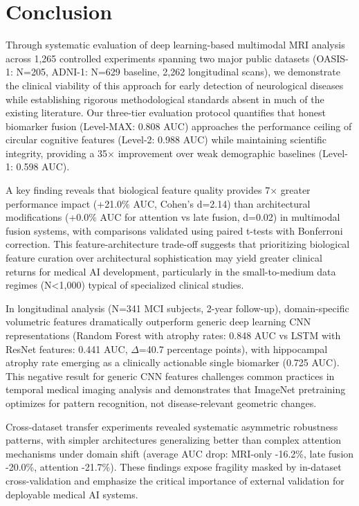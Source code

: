 \documentclass[conference]{IEEEtran}
\begin{document}
\section{Conclusion}

Through systematic evaluation of deep learning-based multimodal MRI analysis across 1,265 controlled experiments spanning two major public datasets (OASIS-1: N=205, ADNI-1: N=629 baseline, 2,262 longitudinal scans), we demonstrate the clinical viability of this approach for early detection of neurological diseases while establishing rigorous methodological standards absent in much of the existing literature. Our three-tier evaluation protocol quantifies that honest biomarker fusion (Level-MAX: 0.808 AUC) approaches the performance ceiling of circular cognitive features (Level-2: 0.988 AUC) while maintaining scientific integrity, providing a 35× improvement over weak demographic baselines (Level-1: 0.598 AUC).

A key finding reveals that biological feature quality provides 7× greater performance impact (+21.0\% AUC, Cohen's d=2.14) than architectural modifications (+0.0\% AUC for attention vs late fusion, d=0.02) in multimodal fusion systems, with comparisons validated using paired t-tests with Bonferroni correction. This feature-architecture trade-off suggests that prioritizing biological feature curation over architectural sophistication may yield greater clinical returns for medical AI development, particularly in the small-to-medium data regimes (N<1,000) typical of specialized clinical studies.

In longitudinal analysis (N=341 MCI subjects, 2-year follow-up), domain-specific volumetric features dramatically outperform generic deep learning CNN representations (Random Forest with atrophy rates: 0.848 AUC vs LSTM with ResNet features: 0.441 AUC, $\Delta$=40.7 percentage points), with hippocampal atrophy rate emerging as a clinically actionable single biomarker (0.725 AUC). This negative result for generic CNN features challenges common practices in temporal medical imaging analysis and demonstrates that ImageNet pretraining optimizes for pattern recognition, not disease-relevant geometric changes.

Cross-dataset transfer experiments revealed systematic asymmetric robustness patterns, with simpler architectures generalizing better than complex attention mechanisms under domain shift (average AUC drop: MRI-only -16.2\%, late fusion -20.0\%, attention -21.7\%). These findings expose fragility masked by in-dataset cross-validation and emphasize the critical importance of external validation for deployable medical AI systems.
\end{document}
